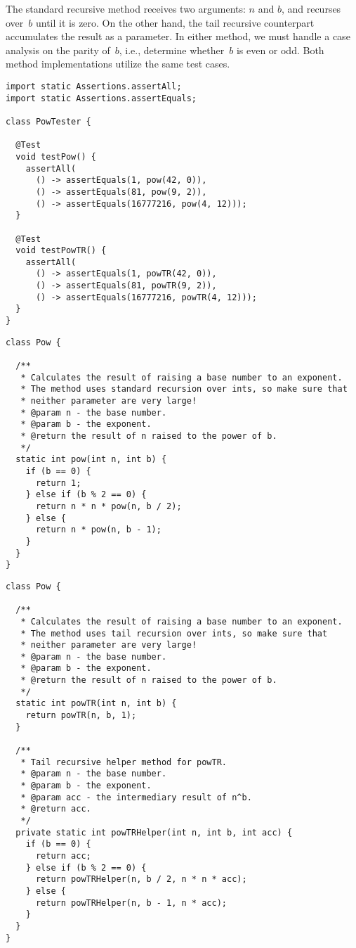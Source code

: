 The standard recursive  method receives two arguments: $n$ and $b$, and recurses over~$b$ until it is zero.
On the other hand, the tail recursive counterpart accumulates the result as a parameter.
In either method, we must handle a case analysis on the parity of~$b$, i.e., determine whether~$b$ is even or odd.
Both method implementations utilize the same test cases.

\begin{lstlisting}[language=MyJava]
import static Assertions.assertAll;
import static Assertions.assertEquals;

class PowTester {

  @Test
  void testPow() {
    assertAll(
      () -> assertEquals(1, pow(42, 0)),
      () -> assertEquals(81, pow(9, 2)),
      () -> assertEquals(16777216, pow(4, 12)));
  }

  @Test
  void testPowTR() {
    assertAll(
      () -> assertEquals(1, powTR(42, 0)),
      () -> assertEquals(81, powTR(9, 2)),
      () -> assertEquals(16777216, powTR(4, 12)));
  }
}
\end{lstlisting}

\begin{lstlisting}[language=MyJava]
class Pow {

  /**
   * Calculates the result of raising a base number to an exponent.
   * The method uses standard recursion over ints, so make sure that
   * neither parameter are very large!
   * @param n - the base number.
   * @param b - the exponent.
   * @return the result of n raised to the power of b.
   */
  static int pow(int n, int b) {
    if (b == 0) {
      return 1;
    } else if (b % 2 == 0) {
      return n * n * pow(n, b / 2);
    } else {
      return n * pow(n, b - 1);
    }
  }
}
\end{lstlisting}

\begin{lstlisting}[language=MyJava]
class Pow {

  /**
   * Calculates the result of raising a base number to an exponent.
   * The method uses tail recursion over ints, so make sure that
   * neither parameter are very large!
   * @param n - the base number.
   * @param b - the exponent.
   * @return the result of n raised to the power of b.
   */
  static int powTR(int n, int b) {
    return powTR(n, b, 1);
  }

  /**
   * Tail recursive helper method for powTR.
   * @param n - the base number.
   * @param b - the exponent.
   * @param acc - the intermediary result of n^b.
   * @return acc.
   */
  private static int powTRHelper(int n, int b, int acc) {
    if (b == 0) { 
      return acc; 
    } else if (b % 2 == 0) {
      return powTRHelper(n, b / 2, n * n * acc);
    } else {
      return powTRHelper(n, b - 1, n * acc);
    }
  }
}
\end{lstlisting}

